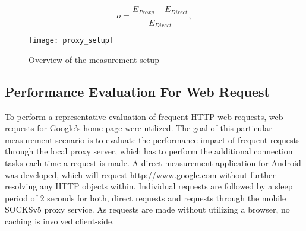 \begin{equation}
o=\frac{\overline{E}_{Proxy} - \overline{E}_{Direct}}{\overline{E}_{Direct}},
\end{equation}
\newline

\begin{figure}
\centering
\texttt{[image: proxy\_setup]}
\caption{Overview of the measurement setup}
\label{fig:proxy_setup}
\end{figure}

\subsection*{Performance Evaluation For Web Request}
To perform a representative evaluation of frequent HTTP
web requests, web requests for Google’s home page were utilized.
The goal of this particular measurement scenario is to evaluate
the performance impact of frequent requests through the local
proxy server, which has to perform the additional connection
tasks each time a request is made. A direct
measurement application for Android was developed, which will request http://www.google.com without further resolving any
HTTP objects within. Individual requests are followed by a
sleep period of 2 seconds for both, direct requests and requests
through the mobile SOCKSv5 proxy service. As requests are
made without utilizing a browser, no caching is involved
client-side.

